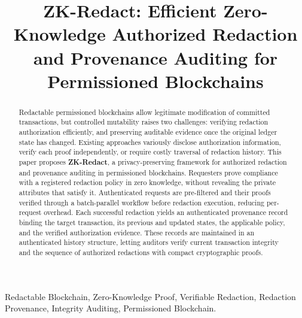 \documentclass[lettersize,journal]{IEEEtran}
\begin{document}
\title{ZK-Redact: Efficient Zero-Knowledge Authorized Redaction and Provenance Auditing for Permissioned Blockchains}


\author{
}

\maketitle

\begin{abstract}
Redactable permissioned blockchains allow legitimate modification of
committed transactions, but controlled mutability raises two challenges:
verifying redaction authorization efficiently, and preserving auditable
evidence once the original ledger state has changed. Existing approaches
variously disclose authorization information, verify each proof
independently, or require costly traversal of redaction history. This
paper proposes \textbf{ZK-Redact}, a privacy-preserving framework for
authorized redaction and provenance auditing in permissioned
blockchains. Requesters prove compliance with a registered redaction
policy in zero knowledge, without revealing the private attributes that
satisfy it. Authenticated requests are pre-filtered and their proofs
verified through a batch-parallel workflow before redaction execution,
reducing per-request overhead. Each successful redaction yields an
authenticated provenance record binding the target transaction, its
previous and updated states, the applicable policy, and the verified
authorization evidence. These records are maintained in an authenticated
history structure, letting auditors verify current transaction integrity
and the sequence of authorized redactions with compact cryptographic
proofs.
\end{abstract}


\begin{IEEEkeywords}
Redactable Blockchain, Zero-Knowledge Proof,
Verifiable Redaction, Redaction Provenance, Integrity Auditing,
Permissioned Blockchain.
\end{IEEEkeywords}
\end{document}
